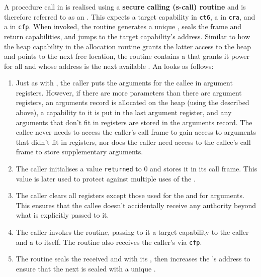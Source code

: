 \documentclass[main.tex]{subfiles}
\begin{document}
A procedure call in  is realised using a \textbf{secure calling (s-call) routine} and is therefore referred to as an \textbf{}. This  expects a target capability in \texttt{ct6}, a  in \texttt{cra}, and a  in \texttt{cfp}. When invoked, the routine generates a unique , seals the frame and return capabilities, and jumps to the target capability's address. Similar to how the heap capability in the allocation routine grants the latter access to the heap and points to the next free location, the  routine contains a  that grants it  power for all  and whose address is the next available . An  looks as follows:

\begin{enumerate}
	
	\item Just as with , the caller puts the arguments for the callee in argument registers. However, if there are more parameters than there are argument registers, an arguments record is allocated on the heap (using the  described above), a capability to it is put in the last argument register, and any arguments that don't fit in registers are stored in the arguments record. The callee never needs to access the caller's call frame to gain access to arguments that didn't fit in registers, nor does the caller need access to the callee's call frame to store supplementary arguments.
	
	\item \label{itm:returned-init} The caller initialises a value \texttt{returned} to 0 and stores it in its call frame. This value is later used to protect against multiple uses of the .
	
	\item The caller clears all registers except those used for the  and for arguments. This ensures that the callee doesn't accidentally receive any authority beyond what is explicitly passed to it.
	
	\item The caller invokes the  routine, passing to it a target capability to the caller and a  to itself. The routine also receives the caller's  via \texttt{cfp}.
	
	\item The routine seals the received  and  with its , then increases the 's address to ensure that the next  is sealed with a unique .
	

\end{enumerate}
\end{document}
